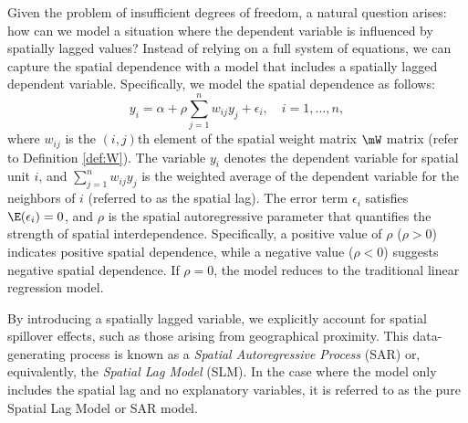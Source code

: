 \documentclass[english,12pt]{book}\usepackage[]{graphicx}\usepackage[]{xcolor}
\begin{document}
Given the problem of insufficient degrees of freedom, a natural question arises: how can we model a situation where the dependent variable is influenced by spatially lagged values? Instead of relying on a full system of equations, we can capture the spatial dependence with a model that includes a spatially lagged dependent variable. Specifically, we model the spatial dependence as follows:
\begin{equation}\label{eq:slm_model_1}
y_i = \alpha +\rho \sum_{j = 1}^n w_{ij}y_j + \epsilon_i, \quad i = 1,\ldots,n,
\end{equation}
%
where $w_{ij}$ is the $(i,j)$th element of the spatial weight matrix $\mW$ matrix (refer to Definition \ref{def:W}). The variable $y_i$ denotes the dependent variable for spatial unit $i$, and $\sum_{j = 1}^n w_{ij} y_j$ is the weighted average of the dependent variable for the neighbors of $i$ (referred to as the spatial lag). The error term $\epsilon_i$ satisfies $\E(\epsilon_i) = 0$, and $\rho$ is the spatial autoregressive parameter that quantifies the strength of spatial interdependence. Specifically, a positive value of $\rho$ ($\rho > 0$) indicates positive spatial dependence, while a negative value ($\rho < 0$) suggests negative spatial dependence. If $\rho = 0$, the model reduces to the traditional linear regression model.

By introducing a spatially lagged variable, we explicitly account for spatial spillover effects, such as those arising from geographical proximity. This data-generating process is known as a \emph{Spatial Autoregressive Process} (SAR) or, equivalently, the \emph{Spatial Lag Model} (SLM). In the case where the model only includes the spatial lag and no explanatory variables, it is referred to as the pure Spatial Lag Model or SAR model.
\end{document}
